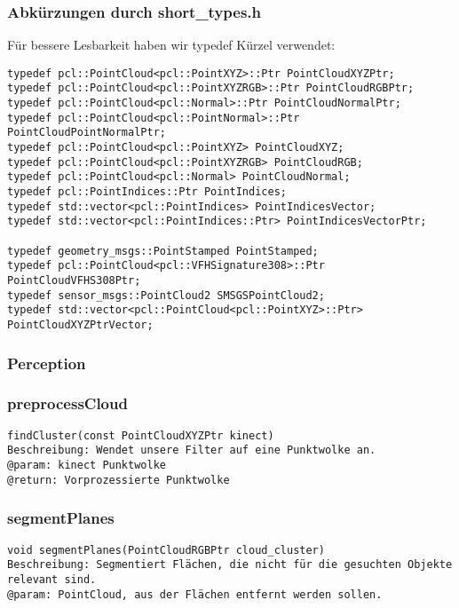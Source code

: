 \documentclass{suturo}
\begin{document}
\subsubsection{Abkürzungen durch short\_types.h}
Für bessere Lesbarkeit haben wir typedef Kürzel verwendet:
\begin{verbatim}
typedef pcl::PointCloud<pcl::PointXYZ>::Ptr PointCloudXYZPtr;
typedef pcl::PointCloud<pcl::PointXYZRGB>::Ptr PointCloudRGBPtr;
typedef pcl::PointCloud<pcl::Normal>::Ptr PointCloudNormalPtr;
typedef pcl::PointCloud<pcl::PointNormal>::Ptr PointCloudPointNormalPtr;
typedef pcl::PointCloud<pcl::PointXYZ> PointCloudXYZ;
typedef pcl::PointCloud<pcl::PointXYZRGB> PointCloudRGB;
typedef pcl::PointCloud<pcl::Normal> PointCloudNormal;
typedef pcl::PointIndices::Ptr PointIndices;
typedef std::vector<pcl::PointIndices> PointIndicesVector;
typedef std::vector<pcl::PointIndices::Ptr> PointIndicesVectorPtr;

typedef geometry_msgs::PointStamped PointStamped;
typedef pcl::PointCloud<pcl::VFHSignature308>::Ptr PointCloudVFHS308Ptr;
typedef sensor_msgs::PointCloud2 SMSGSPointCloud2;
typedef std::vector<pcl::PointCloud<pcl::PointXYZ>::Ptr> PointCloudXYZPtrVector;
\end{verbatim}

\subsubsection*{Perception}

\subsubsection{preprocessCloud}
\begin{verbatim}
findCluster(const PointCloudXYZPtr kinect)
Beschreibung: Wendet unsere Filter auf eine Punktwolke an.
@param: kinect Punktwolke
@return: Vorprozessierte Punktwolke
\end{verbatim}\label{func:preprocesscloud}

\subsubsection{segmentPlanes}
\begin{verbatim}
void segmentPlanes(PointCloudRGBPtr cloud_cluster)
Beschreibung: Segmentiert Flächen, die nicht für die gesuchten Objekte
relevant sind.
@param: PointCloud, aus der Flächen entfernt werden sollen.
\end{verbatim}\label{func:segmentplanes}
\end{document}
